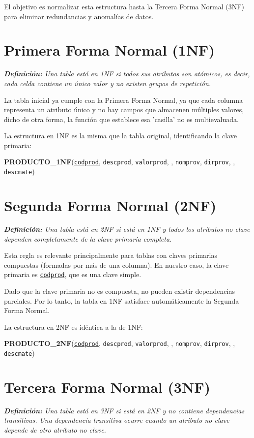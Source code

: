 \documentclass[12pt, a4paper]{article}
\newcommand{\pk}[1]{\underline{\texttt{#1}}}      %
\newcommand{\fk}[1]{\uuline{\texttt{#1}}}      %
\begin{document}
El objetivo es normalizar esta estructura hasta la Tercera Forma Normal (3NF) para eliminar redundancias y anomalías de datos.

\section{Primera Forma Normal (1NF)}
\textit{\textbf{Definición:} Una tabla está en 1NF si todos sus atributos son atómicos, es decir, cada celda contiene un único valor y no existen grupos de repetición.}

La tabla inicial ya cumple con la Primera Forma Normal, ya que cada columna representa un atributo único y no hay campos que almacenen múltiples valores, dicho de otra forma, la función que establece esa 'casilla' no es multievaluada.

La estructura en 1NF es la misma que la tabla original, identificando la clave primaria:
\begin{center}
\textbf{PRODUCTO\_1NF}(\pk{codprod}, \texttt{descprod}, \texttt{valorprod}, \fk{codprove}, \texttt{nomprov}, \texttt{dirprov}, \fk{codmate}, \texttt{descmate})
\end{center}

\section{Segunda Forma Normal (2NF)}
\textit{\textbf{Definición:} Una tabla está en 2NF si está en 1NF y todos los atributos no clave dependen completamente de la clave primaria completa.}

Esta regla es relevante principalmente para tablas con claves primarias compuestas (formadas por más de una columna). En nuestro caso, la clave primaria es \pk{codprod}, que es una clave simple.

Dado que la clave primaria no es compuesta, no pueden existir dependencias parciales. Por lo tanto, la tabla en 1NF satisface automáticamente la Segunda Forma Normal.

La estructura en 2NF es idéntica a la de 1NF:
\begin{center}
\textbf{PRODUCTO\_2NF}(\pk{codprod}, \texttt{descprod}, \texttt{valorprod}, \fk{codprove}, \texttt{nomprov}, \texttt{dirprov}, \fk{codmate}, \texttt{descmate})
\end{center}

\section{Tercera Forma Normal (3NF)}
\textit{\textbf{Definición:} Una tabla está en 3NF si está en 2NF y no contiene dependencias transitivas. Una dependencia transitiva ocurre cuando un atributo no clave depende de otro atributo no clave.}
\end{document}
